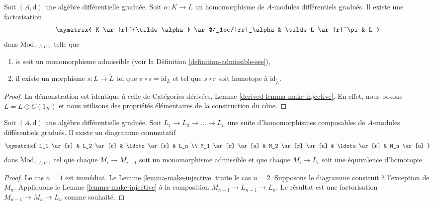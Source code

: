 \begin{lemma}
\label{lemma-make-injective}
Soit $(A, \text{d})$ une algèbre différentielle graduée. Soit $\alpha : K \to L$
un homomorphisme de $A$-modules différentiels gradués. Il existe une factorisation
$$
\xymatrix{
K \ar[r]^{\tilde \alpha} \ar@/_1pc/[rr]_\alpha &
\tilde L \ar[r]^\pi & L
}
$$
dans $\text{Mod}_{(A, \text{d})}$ telle que
\begin{enumerate}
\item $\tilde \alpha$ soit un monomorphisme admissible (voir la Définition
\ref{definition-admissible-ses}),
\item il existe un morphisme $s : L \to \tilde L$ tel que $\pi \circ s =
\text{id}_L$ et tel que $s \circ \pi$ soit homotope à $\text{id}_{\tilde L}$.
\end{enumerate}
\end{lemma}

\begin{proof}
La démonstration est identique à celle de Catégories dérivées, Lemme
\ref{derived-lemma-make-injective}. En effet, nous posons $\tilde L = L \oplus
C(1_K)$ et nous utilisons des propriétés élémentaires de la construction du cône.
\end{proof}

\begin{lemma}
\label{lemma-sequence-maps-split}
Soit $(A, \text{d})$ une algèbre différentielle graduée. Soit $L_1 \to L_2 \to
\ldots \to L_n$ une suite d'homomorphismes composables de $A$-modules
différentiels gradués. Il existe un diagramme commutatif
$$
\xymatrix{
L_1 \ar[r] &
L_2 \ar[r] &
\ldots \ar[r] &
L_n \\
M_1 \ar[r] \ar[u] &
M_2 \ar[r] \ar[u] &
\ldots \ar[r] &
M_n \ar[u]
}
$$
dans $\text{Mod}_{(A, \text{d})}$ tel que chaque $M_i \to M_{i + 1}$ soit un
monomorphisme admissible et que chaque $M_i \to L_i$ soit une équivalence d'homotopie.
\end{lemma}

\begin{proof}
Le cas $n = 1$ est immédiat. Le Lemme \ref{lemma-make-injective} traite le cas $n
= 2$. Supposons le diagramme construit à l'exception de $M_n$. Appliquons
le Lemme \ref{lemma-make-injective} à la composition $M_{n - 1} \to L_{n - 1} \to
L_n$. Le résultat est une factorisation $M_{n - 1} \to M_n \to L_n$ comme
souhaité.
\end{proof}



